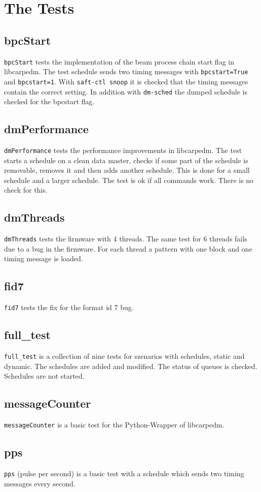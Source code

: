 \documentclass[12pt,a4paper]{report}
\begin{document}
\chapter{The Tests}
\section{bpcStart}
\texttt{bpcStart} tests the implementation of the beam process chain start flag in libcarpedm. 
The test schedule sends two timing messages with \texttt{bpcstart=True} and \texttt{bpcstart=1}.
With \texttt{saft-ctl snoop} it is checked that the timing messages contain the correct setting. 
In addition with \texttt{dm-sched} the dumped schedule is checked for the bpcstart flag.
\section{dmPerformance}
\texttt{dmPerformance} tests the performance improvements in libcarpedm.
The test starts a schedule on a clean data master, checks if some part of the schedule is removable, removes it and 
then adds another schedule. This is done for a small schedule and a larger schedule. The test is ok if all commands 
work. There is no check for this.
\section{dmThreads}
\texttt{dmThreads} tests the firmware with 4 threads. The same test for 6 threads fails due to a bug in the 
firmware. For each thread a pattern with one block and one timing message is loaded.
\section{fid7}
\texttt{fid7} tests the fix for the format id 7 bug.
\section{full\_test}
\texttt{full\_test} is a collection of nine tests for szenarios with schedules, static and dynamic. The schedules are added and modified. The 
status of queues is checked. Schedules are not started.
\section{messageCounter}
\texttt{messageCounter} is a basic test for the Python-Wrapper of libcarpedm.
\section{pps}
\texttt{pps} (pulse per second) is a basic test with a schedule which sends two timing messages every second.
\end{document}
